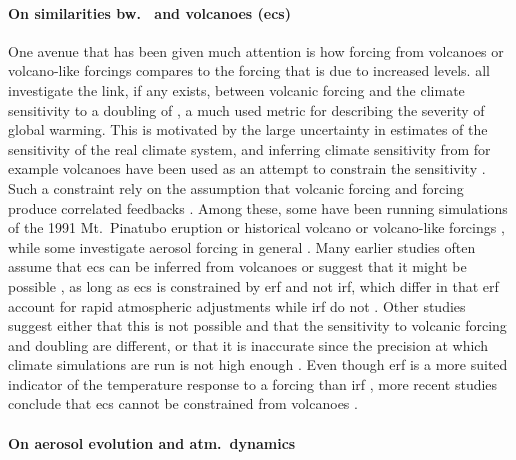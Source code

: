 \documentclass{ametsocV5}
\begin{document}

\paragraph*{On similarities bw.\  and volcanoes (\ac{ecs})}

One avenue that has been given much attention is how forcing from volcanoes or
volcano-like forcings compares to the forcing that is due to increased  levels.
\citet{boer2007,marvel2016,merlis2014,ollila2016,richardson2019,salvi2022,wigley2005}
all investigate the link, if any exists, between volcanic forcing and the climate
sensitivity to a doubling of , a much used metric for describing the severity of
global warming. This is motivated by the large uncertainty in estimates of the
sensitivity of the real climate system, and inferring climate sensitivity from for
example volcanoes have been used as an attempt to constrain the sensitivity
\citep{boer2007}.
Such a constraint rely on the assumption that volcanic forcing and  forcing
produce correlated feedbacks \citep{pauling2023}. Among these, some have been running
simulations of the 1991 Mt.\ Pinatubo eruption \citep{merlis2014,ollila2016} or
historical volcano or volcano-like forcings \citep{boer2007,marvel2016,wigley2005},
while some investigate aerosol forcing in general \citep{richardson2019,salvi2022}. Many
earlier studies often assume that \ac{ecs} can be inferred from volcanoes
\citep{wigley2005} or suggest that it might be possible \citep{bender2010}, as long as
\ac{ecs} is constrained by \ac{erf} and not \ac{irf},
which differ in that \ac{erf} account for rapid atmospheric adjustments while \ac{irf}
do not \citep{richardson2019}. Other studies suggest either that this is not possible
and that the sensitivity to volcanic forcing and  doubling are different, or
that it is inaccurate since the precision at which climate simulations are run is not
high enough \citep{douglass2006,boer2007,salvi2022}. Even though \ac{erf} is a more
suited indicator of the temperature response to a forcing than \ac{irf}
\citep{marvel2016,richardson2019}, more recent studies conclude that \ac{ecs} cannot be
constrained from volcanoes \citep{pauling2023}.

\paragraph*{On aerosol evolution and atm.\ dynamics}
\end{document}
